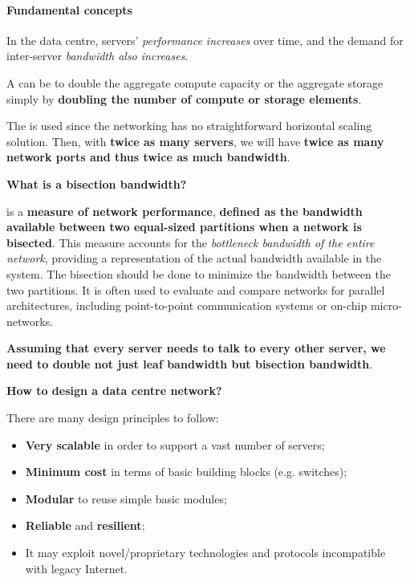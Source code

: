 \paragraph{Fundamental concepts}

In the data centre, servers' \emph{performance increases} over time, and the demand for inter-server \emph{bandwidth also increases}.

\highspace
A  can be to double the aggregate compute capacity or the aggregate storage simply by \textbf{doubling the number of compute or storage elements}.

\highspace
The  is used since the networking has no straightforward horizontal scaling solution. Then, with \textbf{twice as many servers}, we will have \textbf{twice as many network ports and thus twice as much bandwidth}.

\highspace
\begin{flushleft}
    \textcolor{Green3}{ \textbf{What is a bisection bandwidth?}}
\end{flushleft}
 is a \textbf{measure of network performance}, \textbf{defined as the bandwidth available between two equal-sized partitions when a network is bisected}. This measure accounts for the \emph{bottleneck bandwidth of the entire network}, providing a representation of the actual bandwidth available in the system. The bisection should be done to minimize the bandwidth between the two partitions. It is often used to evaluate and compare networks for parallel architectures, including point-to-point communication systems or on-chip micro-networks.

\highspace
\textbf{Assuming that every server needs to talk to every other server, we need to double not just leaf bandwidth but bisection bandwidth}.

\highspace
\begin{flushleft}
    \textcolor{Green3}{ \textbf{How to design a data centre network?}}
\end{flushleft}
There are many design principles to follow:
\begin{itemize}
    \item \textbf{Very scalable} in order to support a vast number of servers;
    \item \textbf{Minimum cost} in terms of basic building blocks (e.g. switches);
    \item \textbf{Modular} to reuse simple basic modules;
    \item \textbf{Reliable} and \textbf{resilient};
    \item It may exploit novel/proprietary technologies and protocols incompatible with legacy Internet.
\end{itemize}

